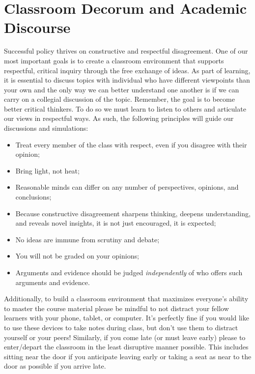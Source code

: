 \documentclass[11pt]{article}
\begin{document}
\section*{Classroom Decorum and Academic Discourse}

Successful policy thrives on constructive and respectful disagreement. One of our most important goals is to create a classroom environment that supports respectful, critical inquiry through the free exchange of ideas. As part of learning, it is essential to discuss topics with individual who have different viewpoints than your own and the only way we can better understand one another is if we can carry on a collegial discussion of the topic. Remember, the goal is to become better critical thinkers. To do so we must learn to listen to others and articulate our views in respectful ways. As such, the following principles will guide our discussions and simulations:

\begin{itemize}
\item Treat every member of the class with respect, even if you disagree with their opinion;
\item Bring light, not heat;
\item Reasonable minds can differ on any number of perspectives, opinions, and conclusions;
\item Because constructive disagreement sharpens thinking, deepens understanding, and reveals novel insights, it is not just encouraged, it is expected;
\item No ideas are immune from scrutiny and debate;
\item You will not be graded on your opinions;
\item Arguments and evidence should be judged \emph{independently} of who offers such arguments and evidence. 
\end{itemize}

Additionally, to build a classroom environment that maximizes everyone's ability to master the course material please be mindful to not distract your fellow learners with your phone, tablet, or computer. It's perfectly fine if you would like to use these devices to take notes during class, but don't use them to distract yourself or your peers! Similarly, if you come late (or must leave early) please to enter/depart  the classroom in the least disruptive manner possible. This includes sitting near the door if you anticipate leaving early or taking a seat as near to the door as possible if you arrive late. 
\end{document}
